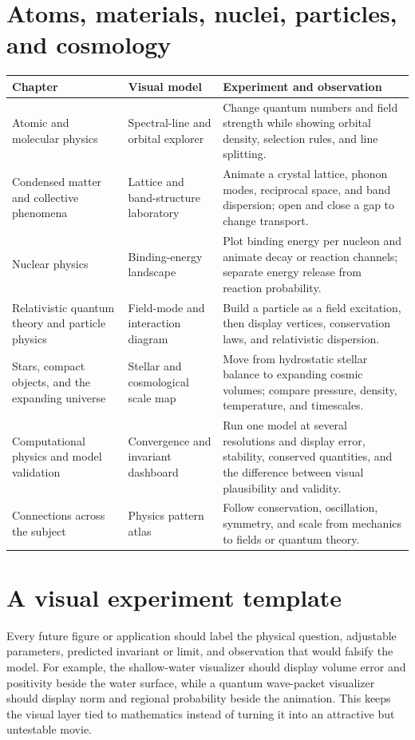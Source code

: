 \documentclass[11pt,oneside]{book}
\theoremstyle{reviewstyle}
\begin{document}
\section{Atoms, materials, nuclei, particles, and cosmology}
\begin{longtable}{p{}p{}p{}}
\toprule Chapter & Visual model & Experiment and observation\\ \midrule
\endhead
Atomic and molecular physics & Spectral-line and orbital explorer & Change quantum numbers and field strength while showing orbital density, selection rules, and line splitting.\\
Condensed matter and collective phenomena & Lattice and band-structure laboratory & Animate a crystal lattice, phonon modes, reciprocal space, and band dispersion; open and close a gap to change transport.\\
Nuclear physics & Binding-energy landscape & Plot binding energy per nucleon and animate decay or reaction channels; separate energy release from reaction probability.\\
Relativistic quantum theory and particle physics & Field-mode and interaction diagram & Build a particle as a field excitation, then display vertices, conservation laws, and relativistic dispersion.\\
Stars, compact objects, and the expanding universe & Stellar and cosmological scale map & Move from hydrostatic stellar balance to expanding cosmic volumes; compare pressure, density, temperature, and timescales.\\
Computational physics and model validation & Convergence and invariant dashboard & Run one model at several resolutions and display error, stability, conserved quantities, and the difference between visual plausibility and validity.\\
Connections across the subject & Physics pattern atlas & Follow conservation, oscillation, symmetry, and scale from mechanics to fields or quantum theory.\\
\bottomrule
\end{longtable}

\section{A visual experiment template}
Every future figure or application should label the physical question, adjustable parameters, predicted invariant or limit, and observation that would falsify the model. For example, the shallow-water visualizer should display volume error and positivity beside the water surface, while a quantum wave-packet visualizer should display norm and regional probability beside the animation. This keeps the visual layer tied to mathematics instead of turning it into an attractive but untestable movie.
\end{document}

